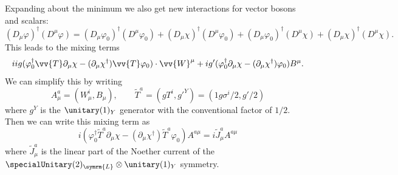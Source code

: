 \documentclass[fleqn]{NotesClass}
\newcommand{\covariantDerivative}{D}
\newcommand{\hermit}{\dagger}
\newcommand{\Left}{\symrm{L}}
\begin{document}
    Expanding about the minimum we also get new interactions for vector bosons and scalars:
    \begin{equation}
        (\covariantDerivative_\mu \varphi)^\hermit (\covariantDerivative^\mu \varphi) = (\covariantDerivative_\mu \varphi_0)^\hermit (\covariantDerivative^\mu \varphi_0) + (\covariantDerivative_\mu \chi)^\hermit (\covariantDerivative^\mu \varphi_0) + (\covariantDerivative_\mu \varphi_0)^\hermit (\covariantDerivative^\mu \chi) + (\covariantDerivative_\mu \chi)^\hermit (\covariantDerivative^\mu \chi).
    \end{equation}
    This leads to the mixing terms
    \begin{equation}
        iig(\varphi_0^\hermit \vv{T} \partial_\mu \chi - (\partial_\mu \chi^\hermit)\vv{T}\varphi_0) \cdot \vv{W}^\mu + ig'(\varphi_0^\hermit \partial_\mu \chi - (\partial_\mu \chi^\hermit)\varphi_0) B^\mu.
    \end{equation}
    We can simplify this by writing
    \begin{equation}
        A^a_\mu = (W^i_\mu, B_\mu), \qquad \tilde{T}^a = (gT^i, g'^Y) = (1g\sigma^i/2, g'/2)
    \end{equation}
    where \(g^Y\) is the \(\unitary(1)_Y\) generator with the conventional factor of \(1/2\).
    Then we can write this mixing term as
    \begin{equation}
        i(\varphi_0^\hermit \tilde{T}^a \partial_\mu \chi - (\partial_\mu \chi^\hermit)\tilde{T}^a \varphi_0)A^{a\mu} = i\tilde{J}^a_\mu A^{a\mu}
    \end{equation}
    where \(\tilde{J}^a_\mu\) is the linear part of the Noether current of the \(\specialUnitary(2)_{\Left} \otimes \unitary(1)_Y\) symmetry.
    
\end{document}
